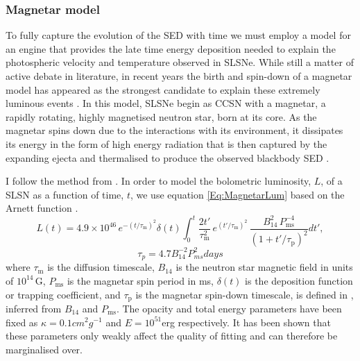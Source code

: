 \subsubsection{Magnetar model}
\label{sec:Magnetar}
To fully capture the evolution of the SED with time we must employ a model for an engine that provides the late time energy deposition needed to explain the photospheric velocity and temperature observed in SLSNe. While still a matter of active debate in literature, in recent years the birth and spin-down of a magnetar model has appeared as the strongest candidate to explain these extremely luminous events \citep{2013ApJ...770..128I,2013Natur.502..346N}. In this model, SLSNe begin as CCSN with a magnetar, a rapidly rotating, highly magnetised neutron star, born at its core. As the magnetar spins down due to the interactions with its environment, it dissipates its energy in the form of high energy radiation that is then captured by the expanding ejecta and thermalised to produce the observed blackbody SED \citep{2010ApJ...717..245K,2010ApJ...719L.204W,2012MNRAS.426L..76D}.

I follow the method from \citet{2013ApJ...770..128I}. In order to model the bolometric luminosity, $L$, of a SLSN as a function of time, $t$, we use equation \ref{Eq:MagnetarLum} based on the Arnett function \citep{1982ApJ...253..785A}.
\begin{equation}
L(t) = 4.9\times 10^{46}\,e^{ -(t / \tau_\mathrm{m})^2 }\delta(t) \int_{0}^{t} \frac{2t'}{\tau_\mathrm{m}^2}\,e^{(t'/\tau_\mathrm{m})^2}\,\frac{B_{14}^{2}\,P_{\mathrm{ms}}^{-4}}{\left(1+t'/\tau_\mathrm{p}\right)^2} dt',
\label{Eq:MagnetarLum}
\end{equation}
\begin{equation}
\label{Eq:SDPeriod}
\tau_{p} = 4.7B_{14}^{-2}P_{ms}^{2}days
\end{equation}
\noindent where $\tau_\mathrm{m}$ is the diffusion timescale, $B_{14}$ is the neutron star magnetic field in units of $10^{14}$\,G, $P_{\mathrm{ms}}$ is the magnetar spin period in ms, $\delta(t)$ is the deposition function or trapping coefficient, and $\tau_\mathrm{p}$ is the magnetar spin-down timescale, is defined in , inferred from $B_{14}$ and $P_{\mathrm{ms}}$. The opacity and total energy parameters have been fixed as $\kappa = 0.1cm^2g^{-1}$ and $E = 10^{51}$erg respectively. It has been shown \citep{2013ApJ...770..128I,2014ApJ...796...87I,2015MNRAS.452.3869N,2015MNRAS.449.1215P} that these parameters only weakly affect the quality of fitting and can therefore be marginalised over.

